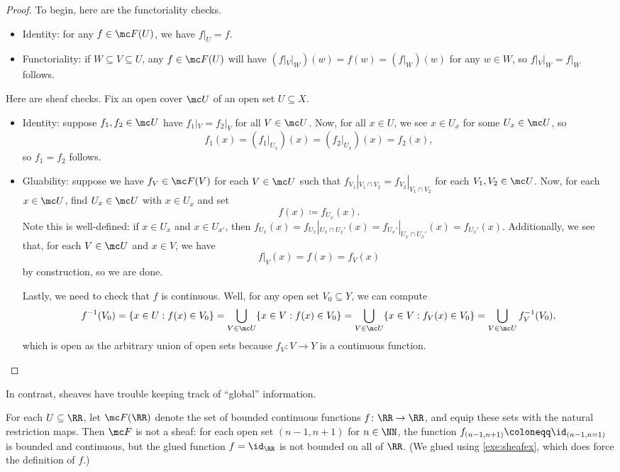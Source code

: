 \documentclass[../notes.tex]{subfiles}
\begin{document}
\begin{proof}
	To begin, here are the functoriality checks.
	\begin{itemize}
		\item Identity: for any $f\in\mc F(U)$, we have $f|_U=f$.
		\item Functoriality: if $W\subseteq V\subseteq U$, any $f\in\mc F(U)$ will have $(f|_V|_W)(w)=f(w)=(f|_W)(w)$ for any $w\in W$, so $f|_V|_W=f|_W$ follows.
	\end{itemize}
	Here are sheaf checks. Fix an open cover $\mc U$ of an open set $U\subseteq X$.
	\begin{itemize}
		\item Identity: suppose $f_1,f_2\in\mc U$ have $f_1|_V=f_2|_V$ for all $V\in\mc U$. Now, for all $x\in U$, we see $x\in U_x$ for some $U_x\in\mc U$, so
		\[f_1(x)=(f_1|_{U_x})(x)=(f_2|_{U_x})(x)=f_2(x),\]
		so $f_1=f_2$ follows.
		\item Gluability: suppose we have $f_V\in\mc F(V)$ for each $V\in\mc U$ such that $f_{V_1}|_{V_1\cap V_2}=f_{V_2}|_{V_1\cap V_2}$ for each $V_1,V_2\in\mc U$. Now, for each $x\in\mc U$, find $U_x\in\mc U$ with $x\in U_x$ and set
		\[f(x)\coloneqq f_{U_x}(x).\]
		Note this is well-defined: if $x\in U_x$ and $x\in U_{x'}$, then $f_{U_x}(x)=f_{U_x}|_{U_x\cap U_x'}(x)=f_{U_x'}|_{U_x\cap U_x'}(x)=f_{U_x'}(x)$. Additionally, we see that, for each $V\in\mc U$ and $x\in V$, we have
		\[f|_V(x)=f(x)=f_V(x)\]
		by construction, so we are done.

		Lastly, we need to check that $f$ is continuous. Well, for any open set $V_0\subseteq Y$, we can compute
		\[f^{-1}(V_0)=\{x\in U:f(x)\in V_0\}=\bigcup_{V\in\mc U}\{x\in V:f(x)\in V_0\}=\bigcup_{V\in\mc U}\{x\in V:f_V(x)\in V_0\}=\bigcup_{V\in\mc U}f_V^{-1}(V_0),\]
		which is open as the arbitrary union of open sets because $f_V\colon V\to Y$ is a continuous function.
		\qedhere
	\end{itemize}
\end{proof}
In contrast, sheaves have trouble keeping track of ``global'' information.
\begin{example}
	For each $U\subseteq\RR$, let $\mc F(\RR)$ denote the set of bounded continuous functions $f\colon\RR\to\RR$, and equip these sets with the natural restriction maps. Then $\mc F$ is not a sheaf: for each open set $(n-1,n+1)$ for $n\in\NN$, the function $f_{(n-1,n+1)}\coloneqq\id_{(n-1,n=1)}$ is bounded and continuous, but the glued function $f=\id_\RR$ is not bounded on all of $\RR$. (We glued using \autoref{exe:sheafex}, which does force the definition of $f$.)
\end{example}
\end{document}
